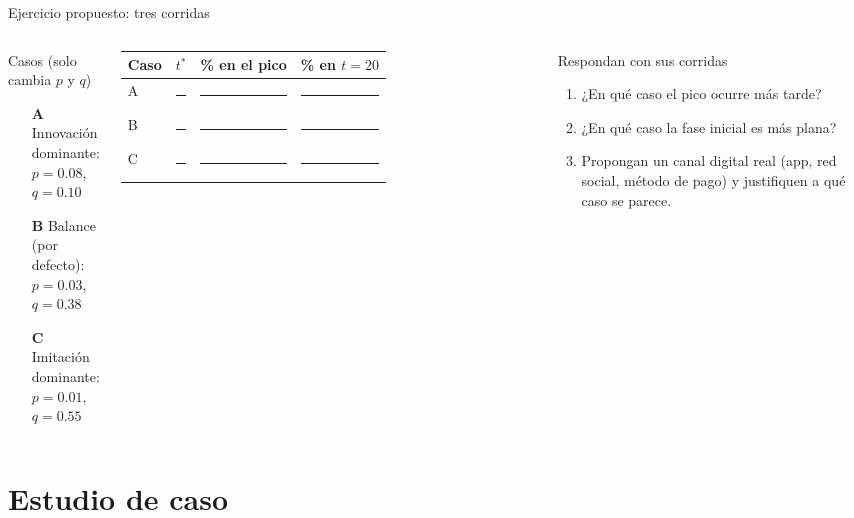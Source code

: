 \documentclass[aspectratio=169,xcolor=dvipsnames]{beamer}
\begin{document}
\begin{frame}{Ejercicio propuesto: tres corridas}
\begin{columns}[T]
  \begin{exampleblock}{Casos (solo cambia $p$ y $q$)}
    \small
    \begin{itemize}
      \item[\textbf{A}] Innovación dominante:\\ $p=0.08$, $q=0.10$
      \item[\textbf{B}] Balance (por defecto):\\ $p=0.03$, $q=0.38$
      \item[\textbf{C}] Imitación dominante:\\ $p=0.01$, $q=0.55$
    \end{itemize}
  \end{exampleblock}
  \small
  \begin{tabular}{@{}lccc@{}}
    \toprule
    Caso & $t^\ast$ & \% en el pico & \% en $t=20$ \\
    \midrule
    A & \rule{1cm}{0.4pt} & \rule{1cm}{0.4pt} & \rule{1cm}{0.4pt} \\[4pt]
    B & \rule{1cm}{0.4pt} & \rule{1cm}{0.4pt} & \rule{1cm}{0.4pt} \\[4pt]
    C & \rule{1cm}{0.4pt} & \rule{1cm}{0.4pt} & \rule{1cm}{0.4pt} \\
    \bottomrule
  \end{tabular}
  \vspace{6pt}
  \begin{block}{Respondan con sus corridas}
    \scriptsize
    \begin{enumerate}
      \item ¿En qué caso el pico ocurre más tarde?
      \item ¿En qué caso la fase inicial es más plana?
      \item Propongan un canal digital real (app, red social, método de pago) y justifiquen a qué caso se parece.
    \end{enumerate}
  \end{block}
\end{columns}
\end{frame}

\section[Caso]{Estudio de caso}
\end{document}

